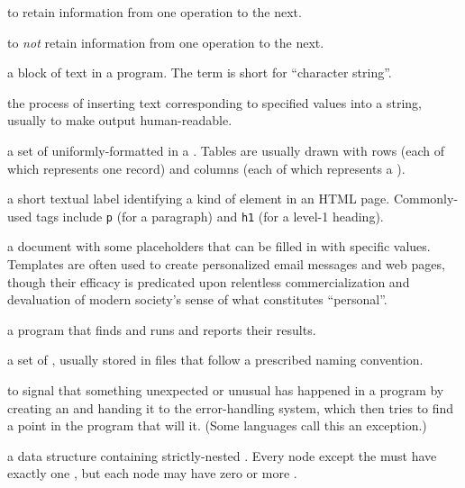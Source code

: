 \begin{description}
to retain information from one operation to the next.

to \emph{not} retain information from one operation to the next.

a block of text in a program. The term is short for ``character string''.

the process of inserting text corresponding to specified values into a string,
usually to make output human-readable.

a set of uniformly-formatted  in a . Tables are usually drawn with rows (each
of which represents one record) and columns (each of which represents a
).

a short textual label identifying a kind of element in an HTML page.
Commonly-used tags include \texttt{p} (for a paragraph) and \texttt{h1} (for a level-1
heading).

a document with some placeholders that can be filled in with specific values.
Templates are often used to create personalized email messages and web pages,
though their efficacy is predicated upon relentless commercialization and
devaluation of modern society's sense of what constitutes ``personal''.

a program that finds and runs  and reports their
results.

a set of , usually stored in files that follow a
prescribed naming convention.

to signal that something unexpected or unusual has happened in a program by
creating an  and handing it to the error-handling
system, which then tries to find a point in the program that will
 it. (Some languages call this \emph{} an
exception.)

a data structure containing strictly-nested . Every node
except the  must have exactly one , but each node may have zero or more
.


\end{description}
